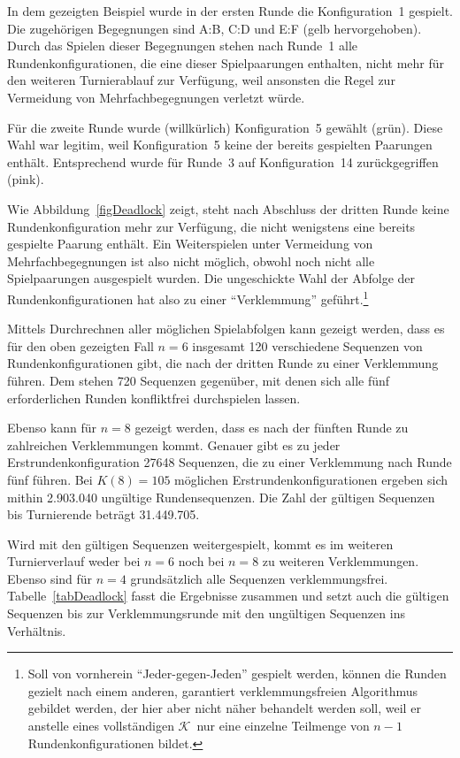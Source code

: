 \documentclass[DIV=15, 10pt]{scrartcl}
\newcommand{\KSet}{$\mathcal{K}$}
\begin{document}
In dem gezeigten Beispiel wurde in der ersten Runde die Konfiguration~1 gespielt. Die zugehörigen Begegnungen sind A:B, C:D und E:F (gelb hervorgehoben). Durch das Spielen dieser Begegnungen stehen nach Runde~1 alle Rundenkonfigurationen, die eine dieser Spielpaarungen enthalten, nicht mehr für den weiteren Turnierablauf zur Verfügung, weil ansonsten die Regel zur Vermeidung von Mehrfachbegegnungen verletzt würde.

Für die zweite Runde wurde (willkürlich) Konfiguration~5 gewählt (grün). Diese Wahl war legitim, weil Konfiguration~5 keine der bereits gespielten Paarungen enthält. Entsprechend wurde für Runde~3 auf Konfiguration~14 zurückgegriffen (pink).

Wie Abbildung~\ref{figDeadlock} zeigt, steht nach Abschluss der dritten Runde keine Rundenkonfiguration mehr zur Verfügung, die nicht wenigstens eine bereits gespielte Paarung enthält. Ein Weiterspielen unter Vermeidung von Mehrfachbegegnungen ist also nicht möglich, obwohl noch nicht alle Spielpaarungen ausgespielt wurden. Die ungeschickte Wahl der Abfolge der Rundenkonfigurationen hat also zu einer "`Verklemmung"' geführt.\footnote{Soll von vornherein "`Jeder-gegen-Jeden"' gespielt werden, können die Runden gezielt nach einem anderen, garantiert verklemmungsfreien Algorithmus gebildet werden, der hier aber nicht näher behandelt werden soll, weil er anstelle eines vollständigen \KSet\ nur eine einzelne Teilmenge von $n-1$ Rundenkonfigurationen bildet.}

Mittels Durchrechnen aller möglichen Spielabfolgen kann gezeigt werden, dass es für den oben gezeigten Fall $n=6$ insgesamt 120 verschiedene Sequenzen von Rundenkonfigurationen gibt, die nach der dritten Runde zu einer Verklemmung führen. Dem stehen 720 Sequenzen gegenüber, mit denen sich alle fünf erforderlichen Runden konfliktfrei durchspielen lassen.

Ebenso kann für $n=8$ gezeigt werden, dass es nach der fünften Runde zu zahlreichen Verklemmungen kommt. Genauer gibt es zu jeder Erstrundenkonfiguration 27648 Sequenzen, die zu einer Verklemmung nach Runde fünf führen. Bei $K(8) = 105$ möglichen Erstrundenkonfigurationen ergeben sich mithin 2.903.040 ungültige Rundensequenzen. Die Zahl der gültigen Sequenzen bis Turnierende beträgt 31.449.705.

Wird mit den gültigen Sequenzen weitergespielt, kommt es im weiteren Turnierverlauf weder bei $n=6$ noch bei $n=8$ zu weiteren Verklemmungen. Ebenso sind für $n=4$ grundsätzlich alle Sequenzen verklemmungsfrei. Tabelle~\ref{tabDeadlock} fasst die Ergebnisse zusammen und setzt auch die gültigen Sequenzen bis zur Verklemmungsrunde mit den ungültigen Sequenzen ins Verhältnis.
\end{document}
